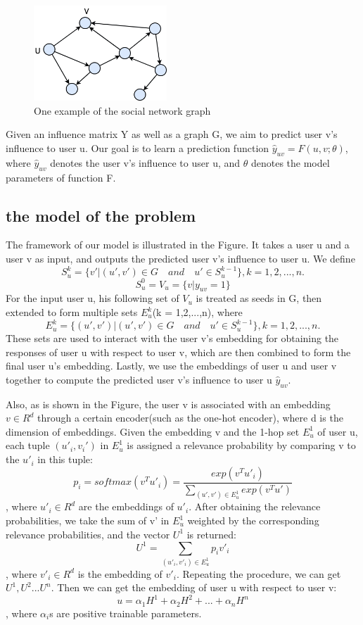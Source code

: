 \documentclass{acmtog} %
\begin{document}
\begin{figure}
\centering
\includegraphics[width=5cm]{network.png}
\caption{One example of the social network graph}
\label{social network}
\end{figure}

Given an influence matrix Y as well as a graph G, we aim to predict user v's influence to user u. Our goal is to learn a prediction function $\hat{y}_{uv}=F(u,v;\theta)$, where $\hat{y}_{uv}$ denotes the user v's influence to user u, and $\theta$ denotes the model parameters of function F.

\subsection{the model of  the problem}

The framework of our model is illustrated in the Figure. It takes a user u and a user v as input, and outputs the predicted user v's influence to user u. We define 
$$S^k_{u}=\{v'|(u',v') \in G \quad and \quad u' \in S^{k-1}_{u} \}, k = 1, 2, ...,n.$$
$$S^0_u=V_u=\{v|y_{uv}=1\}$$
For the input user u, his following set of $V_u$ is treated as seeds in G, then extended to form multiple sets $E^k_u$(k = 1,2,...,n), where 
$$E^k_{u}=\{(u',v')|(u',v') \in G \quad and \quad u' \in S^{k-1}_{u} \}, k = 1, 2, ...,n.$$ 
These sets are used to interact with the user v's embedding for obtaining the responses of user u with respect to user v, which are then combined to form the final user u's embedding. Lastly, we use the embeddings of user u and user v together to compute the predicted user v's influence to user u $\hat{y}_{uv}.$

 Also, as is shown in the Figure, the user v is associated with an embedding $v\in R^d$ through a certain encoder(such as the one-hot encoder), where d is the dimension of embeddings. Given the embedding v and the 1-hop set $E^1_u$ of user u, each tuple $(u'_i,v_i')$ in $E^1_u$ is assigned a relevance probability by comparing v to the $u'_i$ in this tuple:
 $$p_i=softmax(v^T u'_i)=\frac{exp(v^T u'_i)}{\sum_{(u',v')\in E^1_u} exp(v^T u')}$$, where $u'_i \in R^d$  are the embeddings of $u'_i$. After obtaining the relevance probabilities, we take the sum of v' in $E^1_u$ weighted by the corresponding relevance probabilities,
and the vector $U^1$ is returned: $$U^1=\sum_{(u'_i,v'_i)\in E^1_u} p_i v'_i$$, where $v'_i \in R^d$ is the embedding of $v'_i$. Repeating the procedure, we can get $U^1,U^2...U^n$. Then we can get the embedding of user u with respect to user v: 
$$u=\alpha_1 H^1+\alpha_2 H^2+...+\alpha_n H^n$$, where $\alpha_i$s are positive trainable parameters.\\
\end{document}
